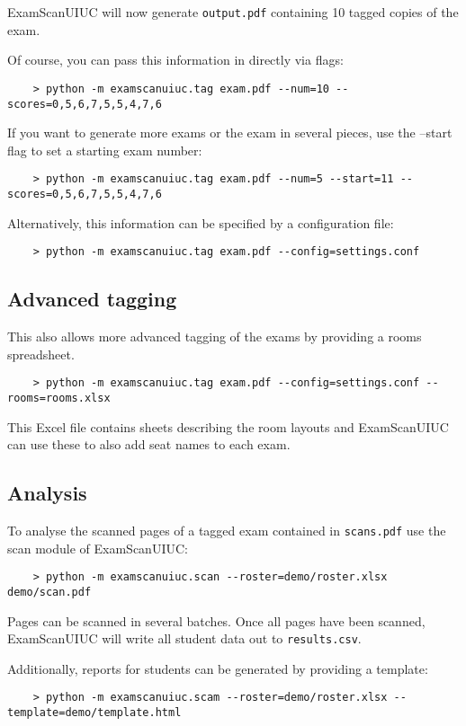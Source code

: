\documentclass[a4paper]{article}
\begin{document}
ExamScanUIUC will now generate \texttt{output.pdf} containing 10 tagged copies of the exam.

Of course, you can pass this information in directly via flags:
\begin{lstlisting}
	> python -m examscanuiuc.tag exam.pdf --num=10 --scores=0,5,6,7,5,5,4,7,6
\end{lstlisting}

If you want to generate more exams or the exam in several pieces, use the --start flag to set a starting exam number:
\begin{lstlisting}
	> python -m examscanuiuc.tag exam.pdf --num=5 --start=11 --scores=0,5,6,7,5,5,4,7,6
\end{lstlisting}

Alternatively, this information can be specified by a configuration file:
\begin{lstlisting}
	> python -m examscanuiuc.tag exam.pdf --config=settings.conf
\end{lstlisting}

\subsection{Advanced tagging}

This also allows more advanced tagging of the exams by providing a rooms spreadsheet.
\begin{lstlisting}
	> python -m examscanuiuc.tag exam.pdf --config=settings.conf --rooms=rooms.xlsx
\end{lstlisting}
This Excel file contains sheets describing the room layouts and ExamScanUIUC can use these to also add seat names to each exam.

\subsection{Analysis}

To analyse the scanned pages of a tagged exam contained in \texttt{scans.pdf} use the scan module of ExamScanUIUC:
\begin{lstlisting}
	> python -m examscanuiuc.scan --roster=demo/roster.xlsx demo/scan.pdf
\end{lstlisting}

Pages can be scanned in several batches.
Once all pages have been scanned, ExamScanUIUC will write all student data out to \texttt{results.csv}.

Additionally, reports for students can be generated by providing a template:
\begin{lstlisting}
	> python -m examscanuiuc.scam --roster=demo/roster.xlsx --template=demo/template.html
\end{lstlisting}
\end{document}
